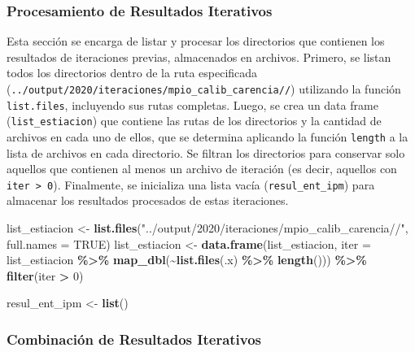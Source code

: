 \documentclass[
  12pt,
]{book}
\newenvironment{Shaded}{\begin{snugshade}}{\end{snugshade}}
\newcommand{\AttributeTok}[1]{\textcolor[rgb]{0.13,0.29,0.53}{#1}}
\newcommand{\ConstantTok}[1]{\textcolor[rgb]{0.56,0.35,0.01}{#1}}
\newcommand{\DecValTok}[1]{\textcolor[rgb]{0.00,0.00,0.81}{#1}}
\newcommand{\FunctionTok}[1]{\textcolor[rgb]{0.13,0.29,0.53}{\textbf{#1}}}
\newcommand{\NormalTok}[1]{#1}
\newcommand{\OtherTok}[1]{\textcolor[rgb]{0.56,0.35,0.01}{#1}}
\newcommand{\SpecialCharTok}[1]{\textcolor[rgb]{0.81,0.36,0.00}{\textbf{#1}}}
\newcommand{\StringTok}[1]{\textcolor[rgb]{0.31,0.60,0.02}{#1}}
\begin{document}
\hypertarget{procesamiento-de-resultados-iterativos}{%
\subsubsection*{Procesamiento de Resultados Iterativos}\label{procesamiento-de-resultados-iterativos}}

Esta sección se encarga de listar y procesar los directorios que contienen los resultados de iteraciones previas, almacenados en archivos. Primero, se listan todos los directorios dentro de la ruta especificada (\texttt{../output/2020/iteraciones/mpio\_calib\_carencia//}) utilizando la función \texttt{list.files}, incluyendo sus rutas completas. Luego, se crea un data frame (\texttt{list\_estiacion}) que contiene las rutas de los directorios y la cantidad de archivos en cada uno de ellos, que se determina aplicando la función \texttt{length} a la lista de archivos en cada directorio. Se filtran los directorios para conservar solo aquellos que contienen al menos un archivo de iteración (es decir, aquellos con \texttt{iter\ \textgreater{}\ 0}). Finalmente, se inicializa una lista vacía (\texttt{resul\_ent\_ipm}) para almacenar los resultados procesados de estas iteraciones.

\begin{Shaded}
\begin{Highlighting}[]
\NormalTok{   list\_estiacion }\OtherTok{\textless{}{-}} \FunctionTok{list.files}\NormalTok{(}\StringTok{"../output/2020/iteraciones/mpio\_calib\_carencia//"}\NormalTok{, }\AttributeTok{full.names =} \ConstantTok{TRUE}\NormalTok{)}
\NormalTok{   list\_estiacion }\OtherTok{\textless{}{-}} \FunctionTok{data.frame}\NormalTok{(list\_estiacion, }\AttributeTok{iter =}\NormalTok{ list\_estiacion }\SpecialCharTok{\%\textgreater{}\%} \FunctionTok{map\_dbl}\NormalTok{(}\SpecialCharTok{\textasciitilde{}}\FunctionTok{list.files}\NormalTok{(.x) }\SpecialCharTok{\%\textgreater{}\%} \FunctionTok{length}\NormalTok{())) }\SpecialCharTok{\%\textgreater{}\%}
     \FunctionTok{filter}\NormalTok{(iter }\SpecialCharTok{\textgreater{}} \DecValTok{0}\NormalTok{)}

\NormalTok{   resul\_ent\_ipm }\OtherTok{\textless{}{-}} \FunctionTok{list}\NormalTok{()}
\end{Highlighting}
\end{Shaded}

\hypertarget{combinaciuxf3n-de-resultados-iterativos}{%
\subsubsection*{Combinación de Resultados Iterativos}\label{combinaciuxf3n-de-resultados-iterativos}}
\end{document}
